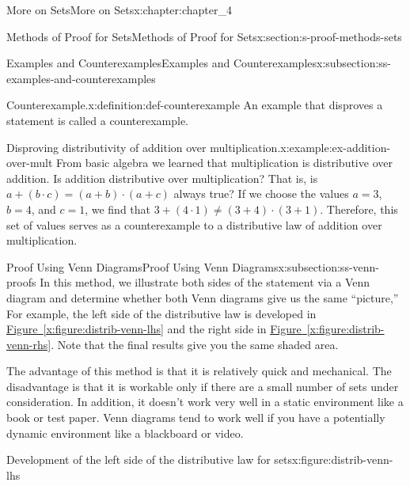 \documentclass[oneside,10pt,]{book}
\newcommand{\xreffont}{\relax}
\begin{document}
\begin{chapterptx}{More on Sets}{}{More on Sets}{}{}{x:chapter:chapter_4}
\begin{sectionptx}{Methods of Proof for Sets}{}{Methods of Proof for Sets}{}{}{x:section:s-proof-methods-sets}
\begin{subsectionptx}{Examples and Counterexamples}{}{Examples and Counterexamples}{}{}{x:subsection:ss-examples-and-counterexamples}
\begin{definition}{Counterexample.}{x:definition:def-counterexample}%
An example that disproves a statement is called a counterexample.%
\end{definition}
\begin{example}{Disproving distributivity of addition over multiplication.}{x:example:ex-addition-over-mult}%
From basic algebra we learned that multiplication is distributive over addition. Is addition distributive over multiplication? That is, is \(a + (b \cdot  c) = (a + b) \cdot  (a + c)\) always true? If we choose the values \(a = 3\), \(b = 4\), and \(c = 1\), we find that \(3 + (4 \cdot  1) \neq  (3 + 4)\cdot (3 + 1)\). Therefore, this set of values serves as a counterexample to a distributive law of addition over multiplication.%
\end{example}
\end{subsectionptx}
%
%
\typeout{************************************************}
\typeout{************************************************}
%
\begin{subsectionptx}{Proof Using Venn Diagrams}{}{Proof Using Venn Diagrams}{}{}{x:subsection:ss-venn-proofs}
In this method, we illustrate both sides of the statement via a Venn diagram and determine whether both Venn diagrams give us the same ``picture,'' For example, the left side of the distributive law is developed in \hyperref[x:figure:distrib-venn-lhs]{Figure~{\xreffont\ref{x:figure:distrib-venn-lhs}}} and the right side in \hyperref[x:figure:distrib-venn-rhs]{Figure~{\xreffont\ref{x:figure:distrib-venn-rhs}}}. Note that the final results give you the same shaded area.%
\par
The advantage of this method is that it is relatively quick and mechanical. The disadvantage is that it is workable only if there are a small number of sets under consideration. In addition, it doesn't work very well in a static environment like a book or test paper.  Venn diagrams tend to work well if you have a potentially dynamic environment like a blackboard or video.%
\begin{figureptx}{Development of the left side of the distributive law for sets}{x:figure:distrib-venn-lhs}{}%
\begin{image}{0}{1}{0}%

\end{image}
\end{figureptx}
\end{subsectionptx}
\end{sectionptx}
\end{chapterptx}
\end{document}
